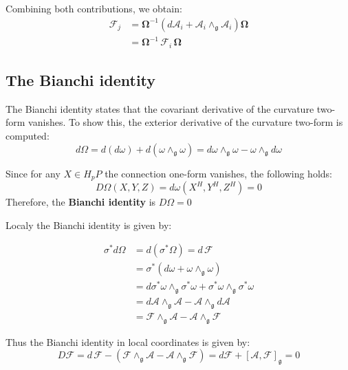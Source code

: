 Combining both contributions, we obtain:
\begin{align*}
  \mathscr{F}_j 
  &= \mathbf{\Omega}^{-1} \left( d\mathbf{\mathcal{A}}_i + \mathbf{\mathcal{A}}_i \wedge_{\mathfrak{g}} \mathbf{\mathcal{A}}_i \right) \mathbf{\Omega} \\
  &= \mathbf{\Omega}^{-1} \, \mathscr{F}_i \, \mathbf{\Omega}
\end{align*}


\subsection{The Bianchi identity}

The Bianchi identity states that the covariant derivative of the curvature two-form vanishes. To show this, the exterior derivative of the curvature two-form is computed:
\[ d\Omega = d(d\omega) + d(\omega \wedge_\mathfrak{g} \omega) = d\omega \wedge_\mathfrak{g} \omega - \omega \wedge_\mathfrak{g} d\omega  \]

Since for any $X \in H_pP$ the connection one-form vanishes, the following holds:
\[ D\Omega(X,Y,Z) = d\omega(X^H,Y^H,Z^H) = 0 \]
Therefore, the \textbf{Bianchi identity} is \( D\Omega=0 \)

Localy the Bianchi identity is given by:

\begin{align*}
  \sigma^*d\Omega &= d(\sigma^*\Omega) = d\,\mathscr{F} \\
  &= \sigma^*(d\omega + \omega \wedge_\mathfrak{g} \omega) \\
    &= d\sigma^*\omega \wedge_\mathfrak{g} \sigma^*\omega + \sigma^*\omega \wedge_\mathfrak{g} \sigma^*\omega \\
    &= d\mathcal{A} \wedge_\mathfrak{g} \mathcal{A} - \mathcal{A}\wedge_\mathfrak{g}d\mathcal{A} \\
    &= \mathscr{F}\wedge_\mathfrak{g} \mathcal{A} - \mathcal{A} \wedge_\mathfrak{g} \mathscr{F}
\end{align*}

Thus the Bianchi identity in local coordinates is given by:
\[ D\mathscr{F} = d\,\mathscr{F} - (\mathscr{F}\wedge_\mathfrak{g} \mathcal{A} - \mathcal{A} \wedge_\mathfrak{g} \mathscr{F}) = d\mathscr{F} + [\mathcal{A},\mathscr{F}]_\mathfrak{g} = 0 \]
